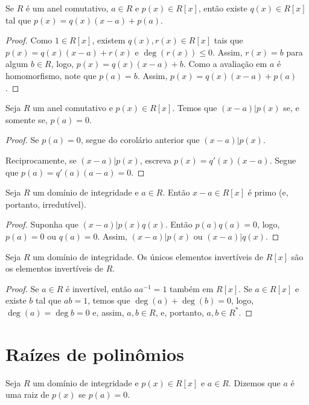 \begin{corol}
Se $R$ é um anel comutativo, $a \in R$ e $p(x)\in R[x]$, então existe $q(x)\in R[x]$ tal que $p(x)=q(x)(x-a)+p(a)$.
\end{corol}
\begin{proof}
    Como $1 \in R[x]$, existem $q(x), r(x) \in R[x]$ tais que $p(x)=q(x)(x-a)+r(x)$ e $\deg(r(x))\leq 0$. Assim, $r(x)=b$ para algum $b \in R$, logo, $p(x)=q(x)(x-a)+b$. Como a avaliação em $a$ é homomorfismo, note que $p(a)=b$. Assim, $p(x)=q(x)(x-a)+p(a)$.
\end{proof}
\begin{prop}
    Seja $R$ um anel comutativo e $p(x)\in R[x]$.
    Temos que $(x-a)|p(x)$ se, e somente se, $p(a)=0$.
\end{prop}
\begin{proof}
    Se $p(a)=0$, segue do corolário anterior que $(x-a)|p(x)$.

    Reciprocamente, se $(x-a)|p(x)$, escreva $p(x)=q'(x)(x-a)$. Segue que $p(a)=q'(a)(a-a)=0$.
\end{proof}

\begin{corol}
Seja $R$ um domínio de integridade e $a \in R$. Então $x-a\in R[x]$ é primo (e, portanto, irredutível).
\end{corol}
\begin{proof}
Suponha que $(x-a)|p(x)q(x)$. Então $p(a)q(a)=0$, logo, $p(a)=0$ ou $q(a)=0$. Assim, $(x-a)|p(x)$ ou $(x-a)|q(x)$.
\end{proof}

\begin{prop}
Seja $R$ um domínio de integridade. Os únicos elementos invertíveis de $R[x]$ são os elementos invertíveis de $R$.
\end{prop}
\begin{proof}
    Se $a \in R$ é invertível, então $aa^{-1}=1$ também em $R[x]$.
    Se $a \in R[x]$ e existe $b$ tal que $ab=1$, temos que $\deg(a)+\deg(b)=0$, logo, $\deg (a)=\deg b=0$ e, assim, $a, b \in R$, e, portanto, $a, b \in R^*$.
\end{proof}
\section{Raízes de polinômios}
\begin{definition}
Seja $R$ um domínio de integridade e $p(x)\in R[x]$ e $a \in R$. Dizemos que $a$ é uma raiz de $p(x)$ se $p(a)=0$.
\end{definition}

